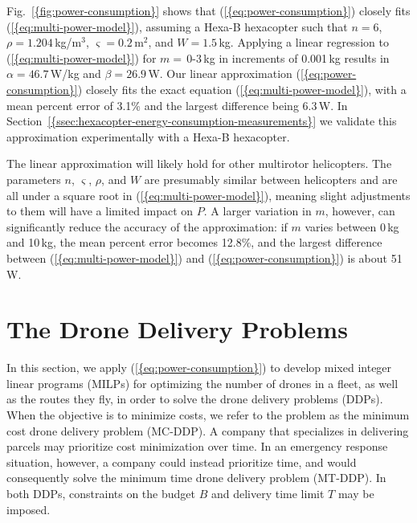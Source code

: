 \documentclass[journal]{IEEEtran}
\begin{document}
{Fig.~\ref{{fig:power-consumption}}} shows that {(\ref{{eq:power-consumption}})} closely fits {(\ref{{eq:multi-power-model}})}, assuming a Hexa-B hexacopter such that ${\ensuremath{n}}=6$, ${\ensuremath{\rho}}=1.204$\,kg/m$^3$, ${\ensuremath{\varsigma}}=0.2$\,m$^2$, and ${\ensuremath{W}}=1.5$\,kg. Applying a linear regression to {(\ref{{eq:multi-power-model}})} for ${\ensuremath{m}}=$\,0-3\,kg in increments of 0.001\,kg results in ${\ensuremath{\alpha}}=46.7$\,W/kg and ${\ensuremath{\beta}}=26.9$\,W. Our linear approximation {(\ref{{eq:power-consumption}})} closely fits the exact equation {(\ref{{eq:multi-power-model}})}, with a mean percent error of 3.1\% and the largest difference being 6.3\,W. In {Section~\ref{{ssec:hexacopter-energy-consumption-measurements}}} we validate this approximation experimentally with a Hexa-B hexacopter.

The linear approximation will likely hold for other multirotor helicopters. The parameters ${\ensuremath{n}}$, ${\ensuremath{\varsigma}}$, ${\ensuremath{\rho}}$, and ${\ensuremath{W}}$ are presumably similar between helicopters and are all under a square root in {(\ref{{eq:multi-power-model}})}, meaning slight adjustments to them will have a limited impact on ${\ensuremath{P}}$. A larger variation in ${\ensuremath{m}}$, however, can significantly reduce the accuracy of the approximation: if ${\ensuremath{m}}$ varies between 0\,kg and 10\,kg, the mean percent error becomes 12.8\%, and the largest difference between {(\ref{{eq:multi-power-model}})} and {(\ref{{eq:power-consumption}})} is about 51\,W.

\section{The Drone Delivery Problems}
\label{sec:the-ddps}

In this section, we apply {(\ref{{eq:power-consumption}})} to develop mixed integer linear programs (MILPs) for optimizing the number of drones in a fleet, as well as the routes they fly, in order to solve the drone delivery problems (DDPs). When the objective is to minimize costs, we refer to the problem as the minimum cost drone delivery problem (MC-DDP). A company that specializes in delivering parcels may prioritize cost minimization over time. In an emergency response situation, however, a company could instead prioritize time, and would consequently solve the minimum time drone delivery problem (MT-DDP). In both DDPs, constraints on the budget ${\ensuremath{B}}$ and delivery time limit ${\ensuremath{T}}$ may be imposed.
\end{document}

